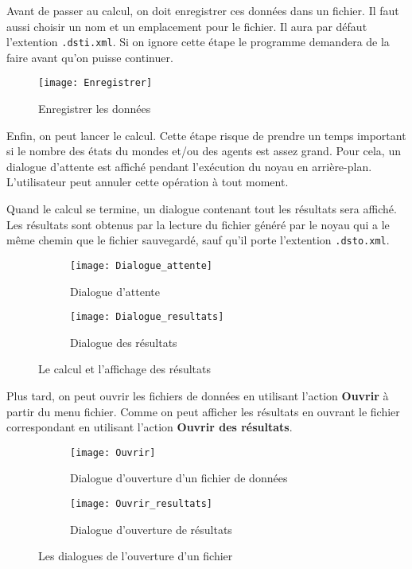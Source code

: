 Avant de passer au calcul, on doit enregistrer ces données dans un fichier. Il faut aussi choisir un nom
et un emplacement pour le fichier. Il aura par défaut l'extention \texttt{.dsti.xml}. Si on ignore cette
étape le programme demandera de la faire avant qu'on puisse continuer.

\begin{figure}[H]
\centering
\texttt{[image: Enregistrer]}
\caption{Enregistrer les données}
\end{figure}

Enfin, on peut lancer le calcul. Cette étape risque de prendre un temps important si le nombre des états
du mondes et/ou des agents est assez grand. Pour cela, un dialogue d'attente est affiché pendant l'exécution
du noyau en arrière-plan. L'utilisateur peut annuler cette opération à tout moment.

Quand le calcul se termine, un dialogue contenant tout les résultats sera affiché. Les résultats sont obtenus
par la lecture du fichier généré par le noyau qui a le même chemin que le fichier sauvegardé, sauf qu'il porte
l'extention \texttt{.dsto.xml}.

\begin{figure}[H]
\begin{subfigure}{0.39\textwidth}
\texttt{[image: Dialogue\_attente]}
\caption{Dialogue d'attente}
\end{subfigure}
\hfill
\begin{subfigure}{0.59\textwidth}
\texttt{[image: Dialogue\_resultats]}
\caption{Dialogue des résultats}
\end{subfigure}
\caption{Le calcul et l'affichage des résultats}
\end{figure}

Plus tard, on peut ouvrir les fichiers de données en utilisant l'action \textbf{Ouvrir} à partir du menu fichier. Comme
on peut afficher les résultats en ouvrant le fichier correspondant en utilisant l'action \textbf{Ouvrir des résultats}.

\begin{figure}[H]
\begin{subfigure}{0.49\textwidth}
\texttt{[image: Ouvrir]}
\caption{Dialogue d'ouverture d'un fichier de données}
\end{subfigure}
\hfill
\begin{subfigure}{0.49\textwidth}
\texttt{[image: Ouvrir\_resultats]}
\caption{Dialogue d'ouverture de résultats}
\end{subfigure}
\caption{Les dialogues de l'ouverture d'un fichier}
\end{figure}

